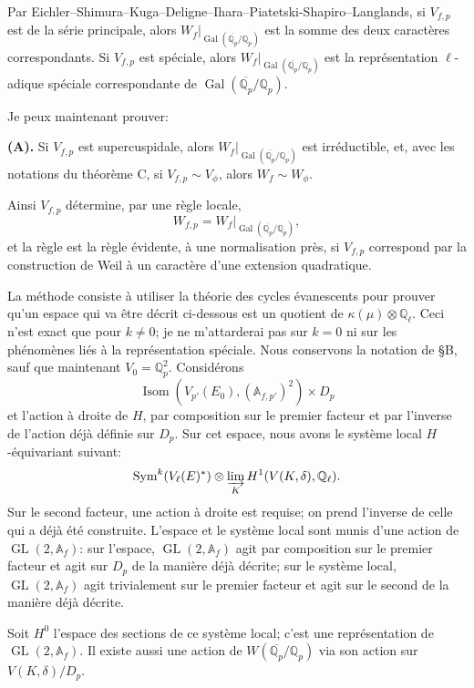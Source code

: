 \documentclass[11pt]{article}
\newcommand{\Qp}{\mathbb{Q}_{p}}
\newcommand{\Ql}{\mathbb{Q}_{\ell}}
\newcommand{\Af}{\mathbb{A}_{f}}
\newcommand{\Afp}{\mathbb{A}_{f,p'}}
\newcommand{\Gal}{\operatorname{Gal}}
\newcommand{\Isom}{\operatorname{Isom}}
\newcommand{\GL}{\operatorname{GL}}
\newcommand{\Sym}{\operatorname{Sym}}
\newcommand{\Lim}{\varinjlim}
\begin{document}
Par Eichler--Shimura--Kuga--Deligne--Ihara--Piatetski-Shapiro--Langlands, si \(V_{f,p}\) est de la série principale, alors \(W_f|_{\Gal(\overline{\Qp}/\Qp)}\) est la somme des deux caractères correspondants. Si \(V_{f,p}\) est spéciale, alors \(W_f|_{\Gal(\overline{\Qp}/\Qp)}\) est la représentation \(\ell\)-adique spéciale correspondante de \(\Gal(\overline{\Qp}/\Qp)\).

Je peux maintenant prouver:

\textbf{(A).} Si \(V_{f,p}\) est supercuspidale, alors \(W_f|_{\Gal(\overline{\Qp}/\Qp)}\) est irréductible, et, avec les notations du théorème C, si \(V_{f,p}\sim V_{\phi}\), alors \(W_f\sim W_{\phi}\).

Ainsi \(V_{f,p}\) détermine, par une règle locale,
\[
W_{f,p}=W_f|_{\Gal(\overline{\Qp}/\Qp)},
\]
et la règle est la règle évidente, à une normalisation près, si \(V_{f,p}\) correspond par la construction de Weil à un caractère d'une extension quadratique.

La méthode consiste à utiliser la théorie des cycles évanescents pour prouver qu'un espace qui va être décrit ci-dessous est un quotient de \(\kappa(\mu)\otimes\Ql\). Ceci n'est exact que pour \(k\neq0\); je ne m'attarderai pas sur \(k=0\) ni sur les phénomènes liés à la représentation spéciale. Nous conservons la notation de \S B, sauf que maintenant \(V_0=\Qp^2\). Considérons
\[
\Isom\!\left(V_{p'}(E_0),(\Afp)^2\right)\times D_p
\]
et l'action à droite de \(H\), par composition sur le premier facteur et par l'inverse de l'action déjà définie sur \(D_p\). Sur cet espace, nous avons le système local \(H\)-équivariant suivant:
\[
\Sym^k(V_{\ell}(E)^*)\otimes \Lim_K H^1(V(K,\delta),\Ql).
\]
Sur le second facteur, une action à droite est requise; on prend l'inverse de celle qui a déjà été construite. L'espace et le système local sont munis d'une action de \(\GL(2,\Af)\): sur l'espace, \(\GL(2,\Af)\) agit par composition sur le premier facteur et agit sur \(D_p\) de la manière déjà décrite; sur le système local, \(\GL(2,\Af)\) agit trivialement sur le premier facteur et agit sur le second de la manière déjà décrite.

Soit \(H^0\) l'espace des sections de ce système local; c'est une représentation de \(\GL(2,\Af)\). Il existe aussi une action de \(W(\overline{\Qp}/\Qp)\) via son action sur \(V(K,\delta)/D_p\).
\end{document}
